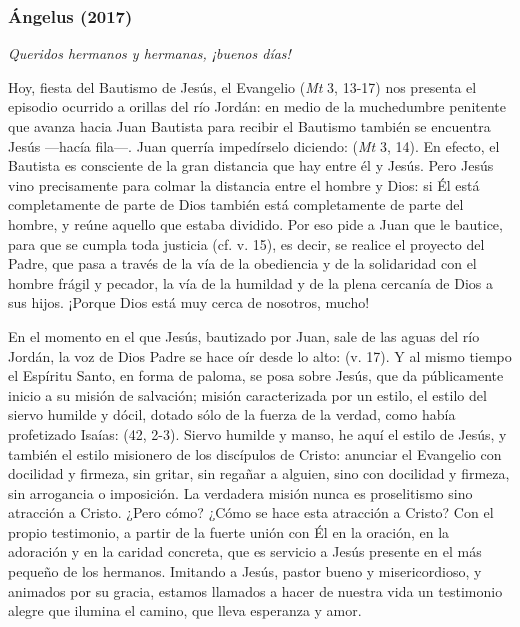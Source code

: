 		\subsubsection{Ángelus (2017)}
		
			
			\begin{body}
				\emph{Queridos hermanos y hermanas, ¡buenos días!}
				
				Hoy, fiesta del Bautismo de Jesús, el Evangelio (\emph{Mt} 3, 13-17) nos presenta el episodio ocurrido a orillas del río Jordán: en medio de la muchedumbre penitente que avanza hacia Juan Bautista para recibir el Bautismo también se encuentra Jesús ---hacía fila---. Juan querría impedírselo diciendo:  (\emph{Mt} 3, 14). En efecto, el Bautista es consciente de la gran distancia que hay entre él y Jesús. Pero Jesús vino precisamente para colmar la distancia entre el hombre y Dios: si Él está completamente de parte de Dios también está completamente de parte del hombre, y reúne aquello que estaba dividido. Por eso pide a Juan que le bautice, para que se cumpla toda justicia (cf. v. 15), es decir, se realice el proyecto del Padre, que pasa a través de la vía de la obediencia y de la solidaridad con el hombre frágil y pecador, la vía de la humildad y de la plena cercanía de Dios a sus hijos. ¡Porque Dios está muy cerca de nosotros, mucho!
				
				En el momento en el que Jesús, bautizado por Juan, sale de las aguas del río Jordán, la voz de Dios Padre se hace oír desde lo alto:  (v. 17). Y al mismo tiempo el Espíritu Santo, en forma de paloma, se posa sobre Jesús, que da públicamente inicio a su misión de salvación; misión caracterizada por un estilo, el estilo del siervo humilde y dócil, dotado sólo de la fuerza de la verdad, como había profetizado Isaías:  (42, 2-3). Siervo humilde y manso, he aquí el estilo de Jesús, y también el estilo misionero de los discípulos de Cristo: anunciar el Evangelio con docilidad y firmeza, sin gritar, sin regañar a alguien, sino con docilidad y firmeza, sin arrogancia o imposición. La verdadera misión nunca es proselitismo sino atracción a Cristo. ¿Pero cómo? ¿Cómo se hace esta atracción a Cristo? Con el propio testimonio, a partir de la fuerte unión con Él en la oración, en la adoración y en la caridad concreta, que es servicio a Jesús presente en el más pequeño de los hermanos. Imitando a Jesús, pastor bueno y misericordioso, y animados por su gracia, estamos llamados a hacer de nuestra vida un testimonio alegre que ilumina el camino, que lleva esperanza y amor.
				

\end{body}
